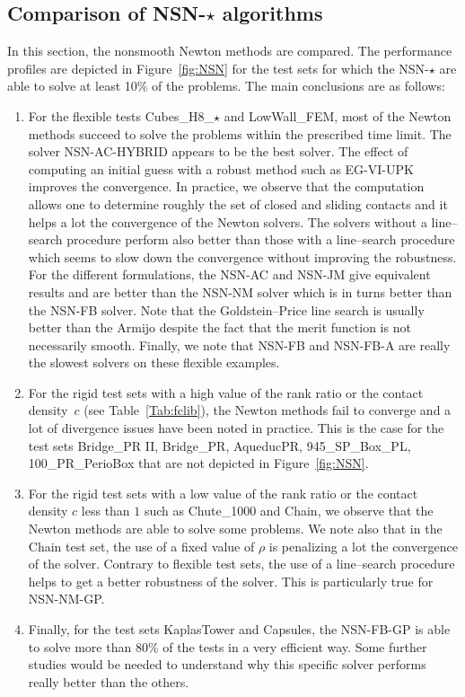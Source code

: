 \subsection{Comparison of {\sf NSN-$\star$} algorithms}

In this section,  the nonsmooth Newton methods  are compared.  The performance profiles are depicted in Figure~\ref{fig:NSN} for the test sets for which the {\sf NSN-$\star$} are able to solve at least 10\% of the problems. The main conclusions are as follows:
\begin{enumerate}
\item For the flexible tests Cubes\_H8\_$\star$ and LowWall\_FEM, most of the Newton methods succeed to solve the problems within the prescribed time limit. The solver {\sf NSN-AC-HYBRID} appears to be the best solver.  The effect of computing an initial guess with a robust method such as {\sf EG-VI-UPK}  improves the convergence. In practice, we observe that the computation allows one to determine roughly the set of closed and sliding contacts and it helps a lot the convergence of the Newton solvers. The solvers without a line--search procedure perform also better than those with a line--search procedure which  seems to slow down the convergence without improving the robustness.  For the different formulations, the {\sf NSN-AC} and {\sf NSN-JM} give equivalent results and are better than the {\sf NSN-NM} solver which is in turns better than the {\sf NSN-FB} solver. Note that the Goldstein--Price line search is usually better than the Armijo despite the fact that the merit function is not necessarily smooth. Finally, we note that  {\sf NSN-FB}  and {\sf NSN-FB-A} are really the slowest solvers on these flexible examples.
\item For the rigid test sets with a high value of the rank ratio or the contact density~$c$ (see Table~\ref{Tab:fclib}), the Newton methods fail to converge and a lot of divergence issues have been noted in practice. This is the case for the test sets Bridge\_PR II, Bridge\_PR, AqueducPR, 945\_SP\_Box\_PL, 100\_PR\_PerioBox that are not depicted in Figure~\ref{fig:NSN}.
\item For the rigid test sets with a low value of the rank ratio or the contact density $c$ less than $1$ such as Chute\_1000 and Chain, we observe that the Newton methods are able to solve some problems. We note also that in the Chain test set, the use of a fixed value of $\rho$ is penalizing a lot the convergence of the solver. Contrary to flexible test sets, the use of a line--search procedure helps  to get a better robustness  of the solver. This is particularly true for {\sf NSN-NM-GP}.
\item Finally, for the test sets KaplasTower and Capsules, the {\sf NSN-FB-GP} is able to solve more than 80\% of the tests in a very efficient way. Some further studies would be needed to understand why this specific solver performs really better than the others.
\end{enumerate}
